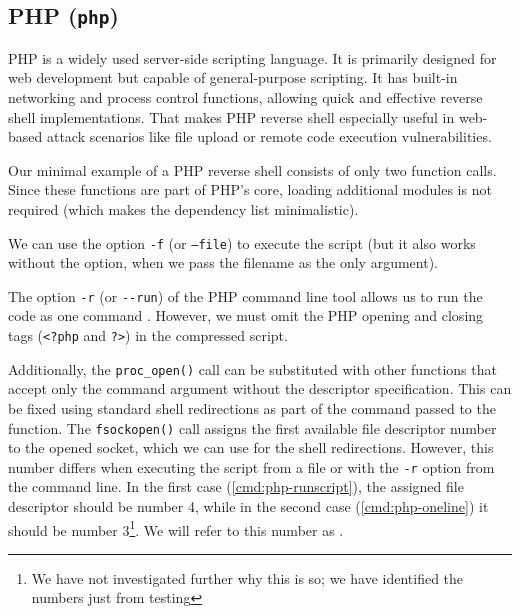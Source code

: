 \subsection{PHP (\texttt{php})}


PHP is a widely used server-side scripting language. It is primarily designed for web development but capable of general-purpose scripting. It has built-in networking and process control functions, allowing quick and effective reverse shell implementations. That makes PHP reverse shell especially useful in web-based attack scenarios like file upload or remote code execution vulnerabilities.

Our minimal example of a PHP reverse shell consists of only two function calls. Since these functions are part of PHP's core, loading additional modules is not required (which makes the dependency list minimalistic).


We can use the option \texttt{-f} (or \texttt{--file}) to execute the script (but it also works without the option, when we pass the filename as the only argument).


The option \texttt{-r} (or \texttt{-{}-run}) of the PHP command line tool allows us to run the code as one command \cite{php-man}. However, we must omit the PHP opening and closing tags (\texttt{<?php} and \texttt{?>}) in the compressed script.


Additionally, the \texttt{proc\_open()} call can be substituted with other functions that accept only the command argument without the descriptor specification. This can be fixed using standard shell redirections as part of the command passed to the function. The \texttt{fsockopen()} call assigns the first available file descriptor number to the opened socket, which we can use for the shell redirections. However, this number differs when executing the script from a file or with the \texttt{-r} option from the command line. In the first case (\cref{cmd:php-runscript}), the assigned file descriptor should be number 4, while in the second case (\cref{cmd:php-oneline}) it should be number 3\footnote{We have not investigated further why this is so; we have identified the numbers just from testing}. We will refer to this number as \fd.


